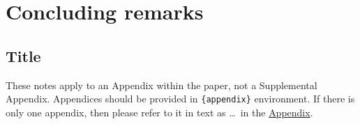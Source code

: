 \documentclass[rbe,fleqn]{econbr}
\begin{document}
\section{Concluding remarks}
\lipsum[1-2]


\clearpage
\begin{appendix}
\section*{Title}\label{appn} %
These notes apply to an Appendix within the paper, not a Supplemental Appendix. Appendices should be provided in \verb|{appendix}| environment. If there is only one appendix, then please refer to it in text as \ldots\ in the \hyperref[appn]{Appendix}.
\end{appendix}
\end{document}
